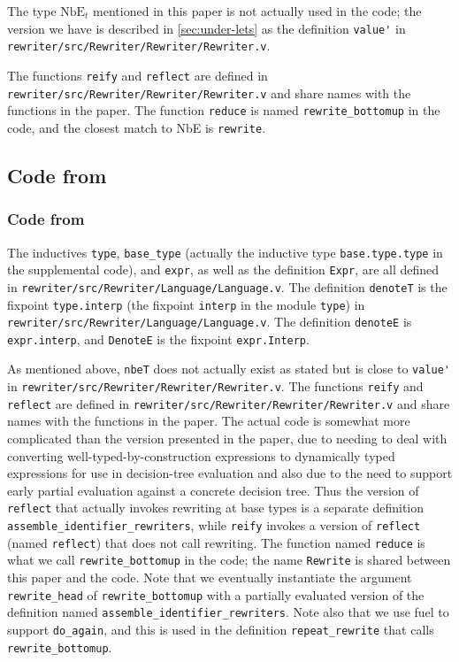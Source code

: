 \documentclass[a4paper,USenglish,cleveref,autoref,thm-restate]{lipics-v2021}
\begin{document}
\begin{minipage}[t][1cm]{\textwidth}
The type $\text{NbE}_t$ mentioned in this paper is not actually used in the code; the version we have is described in \autoref{sec:under-lets} as the definition \verb|value'| in \texttt{rewriter/src/Rewriter/Rewriter/Rewriter.v}.

The functions \verb|reify| and \verb|reflect| are defined in \texttt{rewriter/src/Rewriter/Rewriter/Rewriter.v} and share names with the functions in the paper.
The function \texttt{reduce} is named \verb|rewrite_bottomup| in the code, and the closest match to NbE is \verb|rewrite|.

\subsection{Code from }

\subsubsection{Code from }

The inductives \verb|type|, \verb|base_type| (actually the inductive type \verb|base.type.type| in the supplemental code), and \verb|expr|, as well as the definition \verb|Expr|, are all defined in \texttt{rewriter/src/Rewriter/Language/Language.v}.
The definition \verb|denoteT| is the fixpoint \verb|type.interp| (the fixpoint \verb|interp| in the module \verb|type|) in \texttt{rewriter/src/Rewriter/Language/Language.v}.
The definition \verb|denoteE| is \verb|expr.interp|, and \verb|DenoteE| is the fixpoint \verb|expr.Interp|.

As mentioned above, \verb|nbeT| does not actually exist as stated but is close to \verb|value'| in \texttt{rewriter/src/Rewriter/Rewriter/Rewriter.v}.
The functions \verb|reify| and \verb|reflect| are defined in \texttt{rewriter/src/Rewriter/Rewriter/Rewriter.v} and share names with the functions in the paper.
The actual code is somewhat more complicated than the version presented in the paper, due to needing to deal with converting well-typed-by-construction expressions to dynamically typed expressions for use in decision-tree evaluation and also due to the need to support early partial evaluation against a concrete decision tree.
Thus the version of \verb|reflect| that actually invokes rewriting at base types is a separate definition \verb|assemble_identifier_rewriters|, while \verb|reify| invokes a version of \verb|reflect| (named \verb|reflect|) that does not call rewriting.
The function named \texttt{reduce} is what we call \verb|rewrite_bottomup| in the code; the name \verb|Rewrite| is shared between this paper and the code.
Note that we eventually instantiate the argument \verb|rewrite_head| of \verb|rewrite_bottomup| with a partially evaluated version of the definition named \verb|assemble_identifier_rewriters|.
Note also that we use fuel to support \verb|do_again|, and this is used in the definition \verb|repeat_rewrite| that calls \verb|rewrite_bottomup|.


\end{minipage}
\end{document}
